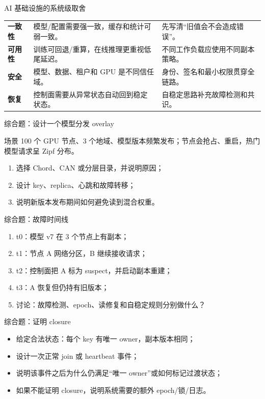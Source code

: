 \documentclass[UTF8,fontset=none,aspectratio=169,10pt]{beamer}
\begin{document}
\begin{frame}{AI 基础设施的系统级取舍}
\begin{tabularx}{\linewidth}{>{\bfseries}p{3.2cm}XX}
\toprule
一致性 & 模型/配置需要强一致，缓存和统计可弱一致。 & 先写清“旧值会不会造成错误”。 \\
可用性 & 训练可回退/重算，在线推理更重视低尾延迟。 & 不同工作负载应使用不同副本策略。 \\
安全 & 模型、数据、租户和 GPU 是不同信任域。 & 身份、签名和最小权限贯穿全链路。 \\
恢复 & 控制面需要从异常状态自动回到稳定状态。 & 自稳定思路补充故障检测和共识。 \\
\bottomrule
\end{tabularx}
\end{frame}


\begin{frame}{综合题：设计一个模型分发 overlay}
\begin{block}{场景}
100 个 GPU 节点、3 个地域、模型版本频繁发布；节点会抢占、重启，热门模型请求呈 Zipf 分布。
\end{block}
\begin{enumerate}
  \item 选择 Chord、CAN 或分层目录，并说明原因；
  \item 设计 key、replica、心跳和故障转移；
  \item 说明新版本发布期间如何避免读到混合权重。
\end{enumerate}
\end{frame}

\begin{frame}{综合题：故障时间线}
\begin{enumerate}
  \item t0：模型 v7 在 3 个节点上有副本；
  \item t1：节点 A 网络分区，B 继续接收请求；
  \item t2：控制面把 A 标为 suspect，并启动副本重建；
  \item t3：A 恢复但仍持有旧版本；
  \item 讨论：故障检测、epoch、读修复和自稳定规则分别做什么？
\end{enumerate}
\end{frame}

\begin{frame}{综合题：证明 closure}
\begin{itemize}
  \item 给定合法状态：每个 key 有唯一 owner，副本版本相同；
  \item 设计一次正常 join 或 heartbeat 事件；
  \item 说明该事件之后为什么仍满足“唯一 owner”或如何标记过渡状态；
  \item 如果不能证明 closure，说明系统需要的额外 epoch/锁/日志。
\end{itemize}
\end{frame}
\end{document}
